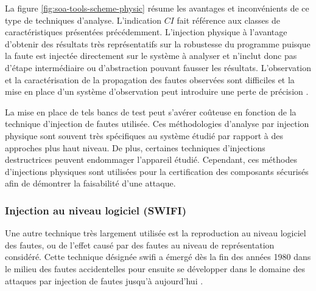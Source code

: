                 La figure \ref{fig:soa-tools-scheme-physic} résume les avantages et inconvénients de ce type de techniques d'analyse. 
                L'indication $CI$ fait référence aux classes de caractéristiques présentées précédemment.
                L'injection physique à l'avantage d'obtenir des résultats très représentatifs sur la robustesse du programme puisque la faute est injectée directement sur le système à analyser et n'inclut donc pas d'étape intermédiaire ou d'abstraction pouvant fausser les résultats.
                L'observation et la caractérisation de la propagation des fautes observées sont difficiles et la mise en place d'un système d'observation peut introduire une perte de précision \cite{Faurax/Phd09, kooli2014survey}.
                
                La mise en place de tels bancs de test peut s'avérer coûteuse en fonction de la technique d'injection de fautes utilisée.
                Ces méthodologies d'analyse par injection physique sont souvent très spécifiques au système étudié par rapport à des approches plus haut niveau.
                De plus, certaines techniques d'injections destructrices peuvent endommager l'appareil étudié.
                Cependant, ces méthodes d'injections physiques sont utilisées pour la certification des composants sécurisés afin de démontrer la faisabilité d'une attaque.               
            
            \subsubsection{Injection au niveau logiciel (SWIFI)}
            \label{sec:soa-tools-swifi}
            
                Une autre technique très largement utilisée est la reproduction au niveau logiciel des fautes, ou de l'effet causé par des fautes au niveau de représentation considéré. 
                Cette technique désignée \gls{swifi} a émergé dès la fin des années 1980 \cite{Segall/FTCS88, Kanawati/FTCS92, Kao/TSE93} dans le milieu des fautes accidentelles pour ensuite se développer dans le domaine des attaques par injection de fautes jusqu'à aujourd'hui \cite{Georgakoudis/ICHPCNSA17}. 
                
